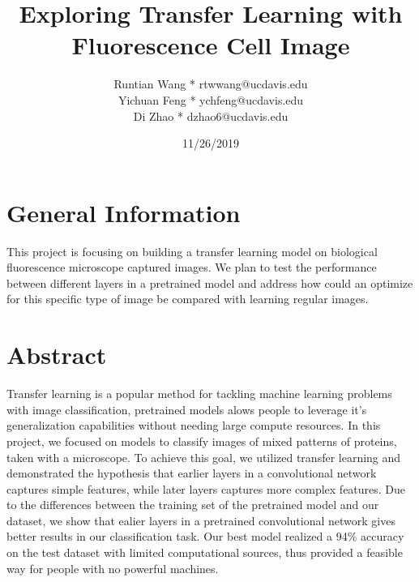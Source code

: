 \documentclass{article}
\begin{document}
\title{Exploring Transfer Learning with Fluorescence Cell Image}
\author{Runtian Wang * rtwwang@ucdavis.edu\\Yichuan Feng * ychfeng@ucdavis.edu\\Di Zhao * dzhao6@ucdavis.edu}
\date{11/26/2019}
\maketitle

\section{General Information}
This project is focusing on building a transfer learning model on biological fluorescence microscope captured images. We plan to test the performance between different layers in a pretrained model and address how could an optimize for this specific type of image be compared with learning regular images. 

\section{Abstract}
Transfer learning is a popular method for tackling machine learning problems with image classification, 
pretrained models alows people to leverage it's generalization capabilities without needing large compute 
resources. In this project, we focused on models to classify images of mixed patterns of proteins,
taken with a microscope. To achieve this goal, we utilized transfer learning 
and demonstrated the hypothesis that earlier layers in a convolutional network captures simple features,
while later layers captures more complex features. Due to the differences between the training set
of the pretrained model and our dataset, we show that ealier layers in a pretrained convolutional network
gives better results in our classification task. Our best model realized a 94\% accuracy on 
the test dataset with limited computational sources, thus provided a feasible way for people with 
no powerful machines.
\end{document}
